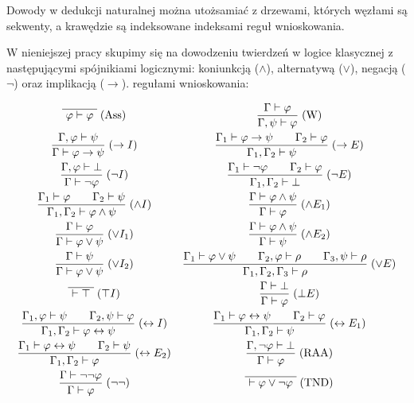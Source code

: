 \documentclass{article}
\begin{document}
Dowody w dedukcji naturalnej można utożsamiać z drzewami, których węzłami są sekwenty,
 a krawędzie są indeksowane indeksami reguł wnioskowania.







W nieniejszej pracy skupimy się na dowodzeniu twierdzeń w logice klasycznej z następującymi spójnikiami logicznymi: koniunkcją ($\land$), alternatywą ($\lor$), negacją ($\neg$) oraz implikacją ($\to$).
regułami wnioskowania:
\begin{center}
\[
\begin{array}{c c}
\displaystyle
\overline{\ \varphi \vdash \varphi\ }\;(\mathrm{Ass})
&
\displaystyle
\frac{\Gamma \vdash \varphi}{\Gamma,\psi \vdash \varphi}\;(\mathrm{W})
\\[2.2ex]
\displaystyle
\frac{\Gamma,\varphi \vdash \psi}{\Gamma \vdash \varphi \to \psi}\;(\to I)
&
\displaystyle
\frac{\Gamma_1 \vdash \varphi \to \psi \qquad \Gamma_2 \vdash \varphi}
     {\Gamma_1,\Gamma_2 \vdash \psi}\;(\to E)
\\[2.2ex]
\displaystyle
\frac{\Gamma,\varphi \vdash \bot}{\Gamma \vdash \neg\varphi}\;(\neg I)
&
\displaystyle
\frac{\Gamma_1 \vdash \neg\varphi \qquad \Gamma_2 \vdash \varphi}
     {\Gamma_1,\Gamma_2 \vdash \bot}\;(\neg E)
\\[2.2ex]
\displaystyle
\frac{\Gamma_1 \vdash \varphi \qquad \Gamma_2 \vdash \psi}
     {\Gamma_1,\Gamma_2 \vdash \varphi \wedge \psi}\;(\wedge I)
&
\displaystyle
\frac{\Gamma \vdash \varphi \wedge \psi}{\Gamma \vdash \varphi}\;(\wedge E_1)
\\[2.2ex]
\displaystyle
\frac{\Gamma \vdash \varphi}{\Gamma \vdash \varphi \vee \psi}\;(\vee I_1)
&
\displaystyle
\frac{\Gamma \vdash \varphi \wedge \psi}{\Gamma \vdash \psi}\;(\wedge E_2)
\\[2.2ex]
\displaystyle
\frac{\Gamma \vdash \psi}{\Gamma \vdash \varphi \vee \psi}\;(\vee I_2)
&
\displaystyle
\frac{\Gamma_1 \vdash \varphi \vee \psi \qquad \Gamma_2,\varphi \vdash \rho \qquad \Gamma_3,\psi \vdash \rho}
     {\Gamma_1,\Gamma_2,\Gamma_3 \vdash \rho}\;(\vee E)
\\[2.2ex]
\displaystyle
\overline{\ \vdash \top\ }\;(\top I)
&
\displaystyle
\frac{\Gamma \vdash \bot}{\Gamma \vdash \varphi}\;(\bot E)
\\[2.2ex]
\displaystyle
\frac{\Gamma_1,\varphi \vdash \psi \qquad \Gamma_2,\psi \vdash \varphi}
     {\Gamma_1,\Gamma_2 \vdash \varphi \leftrightarrow \psi}\;(\leftrightarrow I)
&
\displaystyle
\frac{\Gamma_1 \vdash \varphi \leftrightarrow \psi \qquad \Gamma_2 \vdash \varphi}
     {\Gamma_1,\Gamma_2 \vdash \psi}\;(\leftrightarrow E_1)
\\[2.2ex]
\displaystyle
\frac{\Gamma_1 \vdash \varphi \leftrightarrow \psi \qquad \Gamma_2 \vdash \psi}
     {\Gamma_1,\Gamma_2 \vdash \varphi}\;(\leftrightarrow E_2)
&
\displaystyle
\frac{\Gamma,\neg\varphi \vdash \bot}{\Gamma \vdash \varphi}\;(\mathrm{RAA})
\\[2.2ex]
\displaystyle
\frac{\Gamma \vdash \neg\neg\varphi}{\Gamma \vdash \varphi}\;(\neg\neg)
&
\displaystyle
\overline{\ \vdash \varphi \vee \neg\varphi\ }\;(\mathrm{TND})


\end{array}\]
\end{center}
\end{document}
